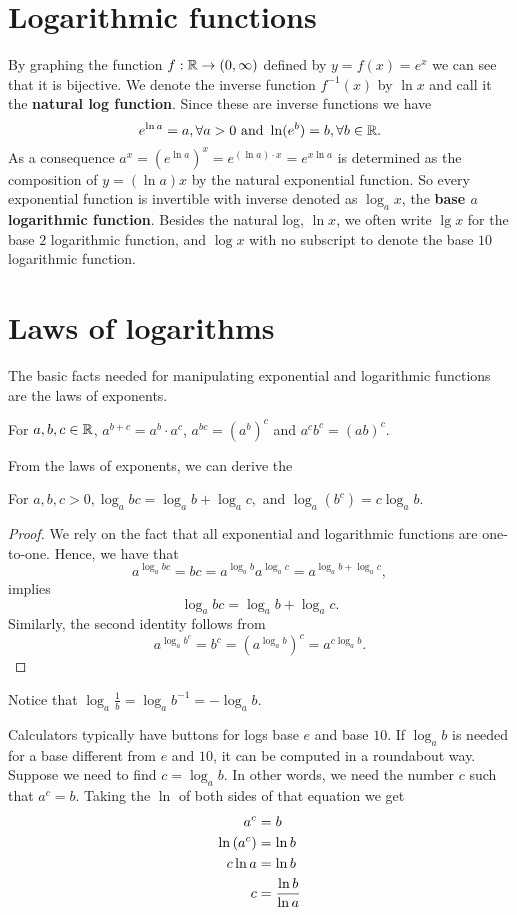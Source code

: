 \section{Logarithmic functions}
By graphing the function $f:\mathbb{R} \to (0,\infty)$ defined by $y=f(x)=e^x$ we
 can see that it is 
bijective. We denote the inverse function $f^{-1}(x)$ by $\ln x$ and call it the 
{\bfseries natural log
function}. Since these are inverse functions we have 
\[
 e^{\ln a}=a, \forall a>0 \text{~and~} \ln (e^b) = b, \forall b\in \mathbb{R}.
\]
As a consequence $a^x=(e^{\ln a})^x=e^{(\ln a) \cdot x}=e^{x\ln a}$ is
 determined as the
 composition of 
$y=(\ln a) x$ by the natural exponential function. 
So every exponential function is invertible with inverse denoted as $\log_a x$, 
the
 {\bfseries base $a$ logarithmic
function}. Besides the natural log, $\ln x$, we often write $\lg x$ for
 the base $2$
 logarithmic function, and
$\log x$ with no subscript to denote the base $10$ logarithmic function. 

\section{Laws of logarithms}
The basic facts needed for manipulating exponential and logarithmic functions
are the laws of exponents.
\begin{thm} 
 For $a,b,c\in \mathbb{R}$, 
 $a^{b+c}=a^b\cdot a^c$, $a^{bc}=(a^b)^c$
 and $a^cb^c=(ab)^c$.
\end{thm}
From the laws of exponents, we can derive the
\begin{thm} 
 For $a, b,c>0,\log_a {bc}=\log_a b + \log_a c,$ and
 $\log_a (b^c)=c\log_a b$.
\end{thm} 
\begin{proof}
 We rely on the fact that all exponential and logarithmic 
 functions are one-to-one. Hence, we have that
 \[
  a^{\log_a bc} = bc = a^{\log_a b}a^{\log_a c}=a^{\log_a b +\log_a c},
 \]
 implies 
 \[
  \log_a bc = \log_a b + \log_a c.
 \] 
 Similarly, the second identity follows from
 \[
  a^{\log_a b^c} = b^c = (a^{\log_a b})^c=a^{c\log_a b}.
 \]
\end{proof}

Notice that $\displaystyle{\log_a \frac{1}{b}= \log_a b^{-1} = -\log_a b}$.

Calculators typically have buttons for logs base $e$ and base $10$.
If $\log_a b$ is needed for a base different from $e$ and $10$,
it can be computed in a roundabout way. Suppose we need
to find $c = \log_a b$. In other words, we need the number $c$
such that $a^c=b$. Taking the $\ln$ of both sides of that equation
we get
\begin{align*}
 a^c &= b \\
 \ln\left(a^c\right) &= \ln b \\
 c\ln a &= \ln b \\
 c &= {{\ln b}\over{\ln a}}
\end{align*}

